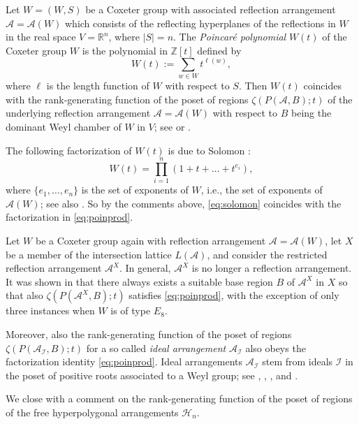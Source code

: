 \documentclass[12pt]{amsart}
\newcommand\CA{{\mathscr A}}
\newcommand\CH{{\mathscr H}}
\newcommand\CI{{\mathcal I}}
\newcommand\BBR{{\mathbb R}}
\newcommand\BBZ{{\mathbb Z}}
\numberwithin{equation}{section}
\theoremstyle{plain}
\theoremstyle{definition}
\begin{document}
Let $W = (W,S)$ be a Coxeter group with associated reflection arrangement 
$\CA = \CA(W)$ which consists of the reflecting hyperplanes of 
the reflections in $W$ in the real space $V=\BBR^n$, where $|S| = n$. 
The 
\emph{Poincar\'e polynomial} $W(t)$ of 
the Coxeter group $W$ is the polynomial in $\BBZ[t]$ defined by 
\begin{equation}
	\label{eq:poncarecoxeter}
	W(t) := \sum_{w \in W} t^{\ell(w)},
\end{equation}
where $\ell$ is the length function 
of $W$ with respect to $S$.
Then $W(t)$
coincides with the rank-generating function of the poset of regions $\zeta(P(\CA,B); t)$ of 
the underlying reflection arrangement 
$\CA = \CA(W)$ with respect to $B$ being the dominant Weyl chamber of $W$ in $V$; 
see \cite{bjoerneredelmanziegler} or \cite{jambuparis:factored}.

The following factorization of 
$W(t)$ is due to Solomon \cite{solomon:chevalley}:
\begin{equation}
	\label{eq:solomon}
	W(t) = \prod_{i=1}^n(1 + t + \ldots + t^{e_i}),
\end{equation}
where $\{e_1, \ldots, e_n\}$ is the 
set of exponents of $W$, i.e., the set of exponents of $\CA(W)$; see also \cite{macdonald:coxeter}. So by the comments above, \eqref{eq:solomon} coincides with the factorization in \eqref{eq:poinprod}.

Let $W$ be a Coxeter group again with reflection arrangement $\CA = \CA(W)$, 
let $X$ be a member of the intersection lattice $L(\CA)$, and consider the restricted reflection arrangement $\CA^X$. In general, $\CA^X$ is no longer a reflection arrangement. 
It was shown in \cite[Thm.~1.3]{moellerroehrle:nice}
that there always exists a suitable base region $B$ of $\CA^X$ in $X$ so that also 
$\zeta(P(\CA^X,B); t)$ satisfies \eqref{eq:poinprod}, with the exception of only three instances when $W$ is of type $E_8$.

Moreover, also the rank-generating function of the poset of regions $\zeta(P(\CA_\CI,B); t)$ for a so called \emph{ideal arrangement} $\CA_\CI$ also obeys the factorization identity \eqref{eq:poinprod}.
Ideal arrangements $\CA_\CI$ stem from ideals $\CI$ in the poset of positive roots associated to a Weyl group; see 
\cite{sommerstymoczko}, 
\cite{abeetall:weyl},
\cite{roehrle:ideal}, and \cite{abeetal:hess}.

We close with a comment on the
rank-generating function of the poset of regions %
of the free hyperpolygonal arrangements $\CH_n$.
\end{document}
